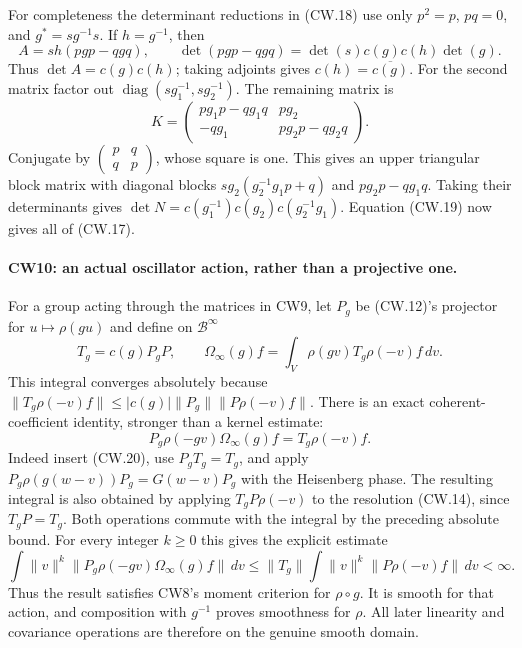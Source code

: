 For completeness the determinant reductions in (CW.18) use only
$p^2=p$, $pq=0$, and $g^*=sg^{-1}s$.  If $h=g^{-1}$, then
\[
 A=sh(pgp-qgq),\qquad
 \det(pgp-qgq)=\det(s)c(g)c(h)\det(g).
\]
Thus $\det A=c(g)c(h)$; taking adjoints gives
$c(h)=\overline{c(g)}$.  For the second matrix factor out
$\operatorname{diag}(sg_1^{-1},sg_2^{-1})$.  The remaining matrix is
\[
 K=\begin{pmatrix}pg_1p-qg_1q&pg_2\\-qg_1&pg_2p-qg_2q\end{pmatrix}.
\]
Conjugate by $\begin{pmatrix}p&q\\q&p\end{pmatrix}$, whose square
is one.  This gives an upper triangular block matrix with diagonal
blocks $sg_2(g_2^{-1}g_1p+q)$ and $pg_2p-qg_1q$.
Taking their determinants gives
$\det N=c(g_1^{-1})c(g_2)c(g_2^{-1}g_1)$.
Equation (CW.19) now gives all of (CW.17).

\paragraph{CW10: an actual oscillator action, rather than a projective one.}
For a group acting through the matrices in CW9, let $P_g$ be
(CW.12)'s projector for $u\mapsto\rho(gu)$ and define on
$\mathcal B^\infty$
\[
 T_g=c(g)P_gP,\qquad
 \Omega_\infty(g)f=\int_V\rho(gv)T_g\rho(-v)f\,dv .      \tag{CW.20}
\]
This integral converges absolutely because
$\|T_g\rho(-v)f\|\le |c(g)|\|P_g\|\|P\rho(-v)f\|$.
There is an exact coherent-coefficient identity, stronger than a
kernel estimate:
\[
 P_g\rho(-gv)\Omega_\infty(g)f=T_g\rho(-v)f.
\]
Indeed insert (CW.20), use $P_gT_g=T_g$, and apply
$P_g\rho(g(w-v))P_g=G(w-v)P_g$ with the Heisenberg phase.
The resulting integral is also obtained by applying
$T_gP\rho(-v)$ to the resolution (CW.14), since $T_gP=T_g$.
Both operations commute with the integral by the preceding absolute
bound.  For every integer $k\ge0$ this gives the explicit estimate
\[
 \int\|v\|^k\|P_g\rho(-gv)\Omega_\infty(g)f\|\,dv
 \le \|T_g\|\int\|v\|^k\|P\rho(-v)f\|\,dv<\infty.
\]
Thus the result satisfies CW8's moment criterion for $\rho\circ g$.
It is smooth for that action, and composition with $g^{-1}$ proves
smoothness for $\rho$.  All later linearity and covariance operations
are therefore on the genuine smooth domain.

